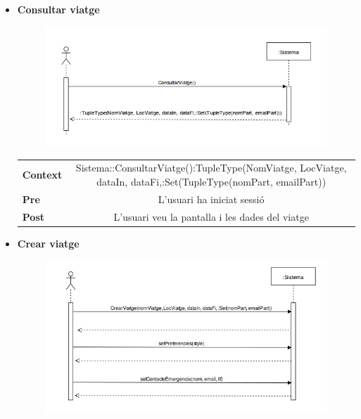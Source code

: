 \begin{itemize}
\item[]\textbf{Consultar viatge}

\begin{figure}[!h]
\centering
\includegraphics[scale=0.8]{Figures/ConsultarViatgeEC.png}
\end{figure}

\begin{table}[!h]
\begin{tabular}{l C}
\textbf{Context}  & Sistema::ConsultarViatge():TupleType(NomViatge, LocViatge, dataIn, dataFi,:Set(TupleType(nomPart, emailPart)) \\
\textbf{Pre} & L'usuari ha iniciat sessió\\
\textbf{Post} &  L'usuari veu la pantalla i les dades del viatge\\
\end{tabular}
\label{}
\end{table}

\clearpage

\item[]\textbf{Crear viatge}

\begin{figure}[!h]
\centering
\includegraphics[scale=0.8]{Figures/CrearViatgeEC.png}
\end{figure}


\end{itemize}
